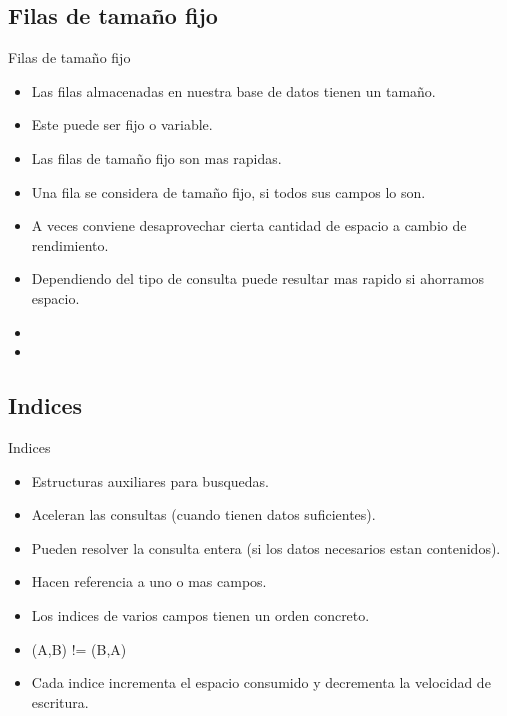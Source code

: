 \subsection{Filas de tamaño fijo}
\begin{frame}{Filas de tamaño fijo}
  \begin{itemize}
    \item Las filas almacenadas en nuestra base de datos tienen un tamaño.
    \item Este puede ser fijo o variable.
    \item Las filas de tamaño fijo son mas rapidas.
    \item Una fila se considera de tamaño fijo, si todos sus campos lo son.
    \item A veces conviene desaprovechar cierta cantidad de espacio a cambio de rendimiento.
    \item Dependiendo del tipo de consulta puede resultar mas rapido si ahorramos espacio.
    \item 
    \item 
  \end{itemize}
\end{frame}

\subsection{Indices}
\begin{frame}{Indices}
  \begin{itemize}
    \item Estructuras auxiliares para busquedas.
    \item Aceleran las consultas (cuando tienen datos suficientes).
    \item Pueden resolver la consulta entera (si los datos necesarios estan contenidos).
    \item Hacen referencia a uno o mas campos.
    \item Los indices de varios campos tienen un orden concreto.
    \item (A,B) != (B,A)
    \item Cada indice incrementa el espacio consumido y decrementa la velocidad de escritura.
  \end{itemize}
\end{frame}

